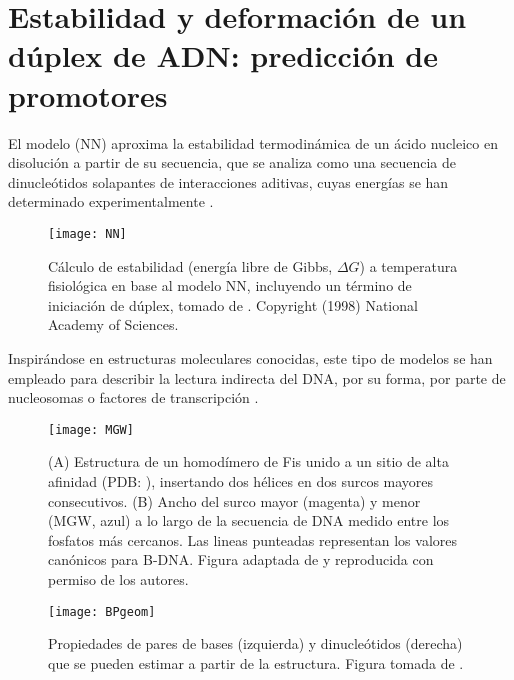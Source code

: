 \section{Estabilidad y deformaci\'{o}n de un d\'{u}plex de ADN: predicci\'{o}n de promotores} \label{dna1}
 
 
El modelo  (NN) aproxima la estabilidad termodin\'{a}mica de un \'{a}cido nucleico en disoluci\'{o}n
a partir de su secuencia, que se analiza como una secuencia de dinucle\'{o}tidos solapantes 
de interacciones aditivas, cuyas energ\'{i}as se han determinado experimentalmente \citep{Breslauer1986,SantaLucia1998}.

\begin{figure}
\begin{center} 
\texttt{[image: NN]}
\caption
{
C\'{a}lculo de estabilidad (energ\'{i}a libre de Gibbs, $\Delta G$) a temperatura fisiol\'{o}gica en base al modelo NN, 
incluyendo un t\'{e}rmino de iniciaci\'{o}n de d\'{u}plex, tomado de \citep{SantaLucia1998}.
Copyright (1998) National Academy of Sciences.
}
\label{fig:NN}
\end{center}
\end{figure}

Inspir\'{a}ndose en estructuras moleculares conocidas, 
este tipo de modelos se han empleado para describir la lectura indirecta del DNA, por su forma, 
por parte de nucleosomas \citep{Heijden2012} o factores de transcripci\'{o}n \citep{Gromiha2004,Espinosa2008}.

\begin{figure}
\begin{center} 
\texttt{[image: MGW]}
\caption
{
(A) Estructura de un homod\'{i}mero de Fis unido a un sitio de alta afinidad 
(PDB: ), 
insertando dos h\'{e}lices en dos surcos mayores consecutivos. 
(B) Ancho del surco mayor (magenta) y menor (MGW, azul) a lo largo de la secuencia de DNA medido entre los fosfatos m\'{a}s cercanos.
Las lineas punteadas representan los valores can\'{o}nicos para B-DNA. 
Figura adaptada de \citet{Hancock2013} y reproducida con permiso de los autores.
}
\label{fig:MGW}
\end{center}
\end{figure}

\begin{figure}
\begin{center} 
\texttt{[image: BPgeom]}
\caption
{
Propiedades de pares de bases (izquierda) y dinucle\'{o}tidos (derecha) que se pueden estimar a partir de la estructura. 
Figura tomada de .
}
\label{fig:BPgeometry}
\end{center}
\end{figure}

